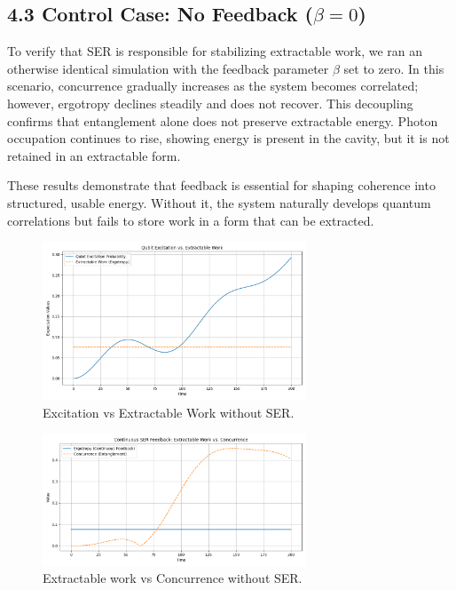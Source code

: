 \documentclass[a4paper,11pt]{article}
\begin{document}
\subsection{4.3 Control Case: No Feedback ($\beta = 0$)}

To verify that SER is responsible for stabilizing extractable work, we ran an otherwise identical simulation with the feedback parameter $\beta$ set to zero. In this scenario, concurrence gradually increases as the system becomes correlated; however, ergotropy declines steadily and does not recover. This decoupling confirms that entanglement alone does not preserve extractable energy. Photon occupation continues to rise, showing energy is present in the cavity, but it is not retained in an extractable form.

These results demonstrate that feedback is essential for shaping coherence into structured, usable energy. Without it, the system naturally develops quantum correlations but fails to store work in a form that can be extracted.

\begin{figure}[h]
    \centering
    \includegraphics[width=0.7\textwidth]{Figure6.png}
    \caption{Excitation vs Extractable Work without SER.}
    \label{fig:excite}
\end{figure}

\begin{figure}[h]
    \centering
    \includegraphics[width=0.7\textwidth]{Figure7.png}
    \caption{Extractable work vs Concurrence without SER.}
    \label{fig:work}
\end{figure}
\end{document}
